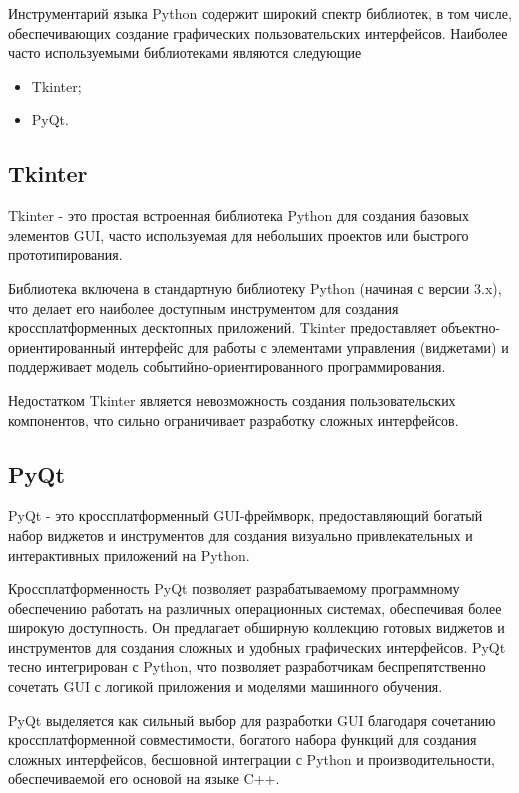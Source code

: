 Инструментарий языка Python содержит широкий спектр библиотек, в том числе, обеспечивающих создание графических пользовательских интерфейсов. 
Наиболее часто используемыми библиотеками являются следующие

\begin{itemize}
  \item Tkinter;
  \item PyQt.
\end{itemize}


\subsection{Tkinter}

Tkinter - это простая встроенная библиотека Python
для создания базовых элементов GUI, часто
используемая для небольших проектов или быстрого
прототипирования. 

Библиотека включена в стандартную библиотеку Python
(начиная с версии 3.x), что делает его наиболее
доступным инструментом для создания
кроссплатформенных десктопных приложений. Tkinter
предоставляет объектно-ориентированный интерфейс для
работы с элементами управления (виджетами) и
поддерживает модель событийно-ориентированного
программирования.

Недостатком Tkinter является невозможность создания пользовательских
компонентов, что сильно ограничивает разработку сложных интерфейсов.

\subsection{PyQt}

PyQt - это кроссплатформенный GUI-фреймворк,
предоставляющий богатый набор виджетов и
инструментов для создания визуально привлекательных
и интерактивных приложений на Python.

Кроссплатформенность PyQt позволяет разрабатываемому
программному обеспечению работать на различных
операционных системах, обеспечивая более широкую
доступность. Он предлагает обширную коллекцию
готовых виджетов и инструментов для создания сложных
и удобных графических интерфейсов. PyQt тесно
интегрирован с Python, что позволяет разработчикам
беспрепятственно сочетать GUI с логикой приложения и
моделями машинного обучения.

PyQt выделяется как сильный выбор для разработки GUI благодаря сочетанию
кроссплатформенной совместимости, богатого набора функций для создания сложных
интерфейсов, бесшовной интеграции с Python и производительности, обеспечиваемой
его основой на языке C++. 

